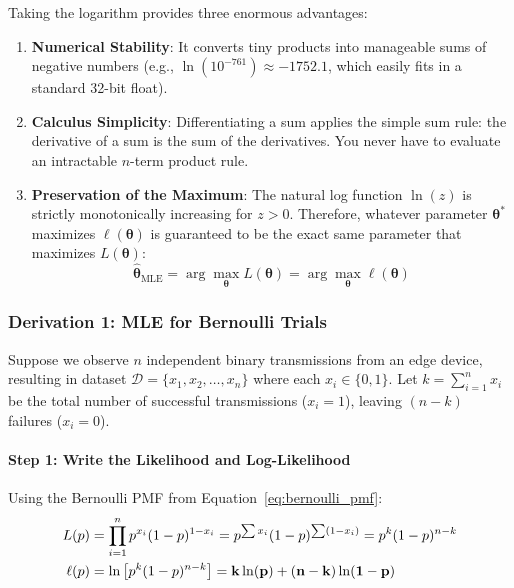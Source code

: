 Taking the logarithm provides three enormous advantages:
\begin{enumerate}
    \item \textbf{Numerical Stability}: It converts tiny products into manageable sums of negative numbers (e.g., $\ln(10^{-761}) \approx -1752.1$, which easily fits in a standard 32-bit float).
    \item \textbf{Calculus Simplicity}: Differentiating a sum applies the simple sum rule: the derivative of a sum is the sum of the derivatives. You never have to evaluate an intractable $n$-term product rule.
    \item \textbf{Preservation of the Maximum}: The natural log function $\ln(z)$ is strictly monotonically increasing for $z > 0$. Therefore, whatever parameter $\mathbf{\theta}^*$ maximizes $\ell(\mathbf{\theta})$ is guaranteed to be the exact same parameter that maximizes $L(\mathbf{\theta})$:
    \begin{equation}
    \hat{\mathbf{\theta}}_{\text{MLE}} = \arg\max_{\mathbf{\theta}} L(\mathbf{\theta}) = \arg\max_{\mathbf{\theta}} \ell(\mathbf{\theta})
    \end{equation}
\end{enumerate}

\subsubsection{Derivation 1: MLE for Bernoulli Trials}
Suppose we observe $n$ independent binary transmissions from an edge device, resulting in dataset $\mathcal{D} = \{x_1, x_2, \dots, x_n\}$ where each $x_i \in \{0, 1\}$. 
Let $k = \sum_{i=1}^{n} x_i$ be the total number of successful transmissions ($x_i = 1$), leaving $(n - k)$ failures ($x_i = 0$).

\paragraph{Step 1: Write the Likelihood and Log-Likelihood}
Using the Bernoulli PMF from Equation~\eqref{eq:bernoulli_pmf}:
\begin{align}
L(p) &= \prod_{i=1}^{n} p^{x_i} (1 - p)^{1 - x_i} = p^{\sum x_i} (1 - p)^{\sum (1 - x_i)} = p^k (1 - p)^{n - k} \notag\\
\ell(p) &= \ln \left[ p^k (1 - p)^{n - k} \right] = \mathbf{k \ln(p) + (n - k) \ln(1 - p)}\label{eq:bernoulli_log_lik}
\end{align}

